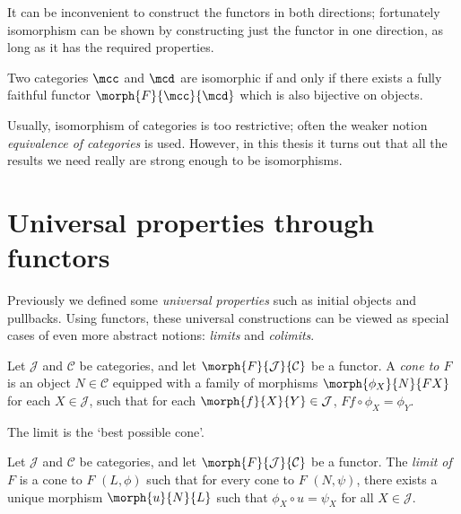It can be inconvenient to construct the functors in both directions; fortunately
isomorphism can be shown by constructing just the functor in one direction, as
long as it has the required properties.

\begin{lemma}
    Two categories \(\mcc\) and \(\mcd\) are isomorphic if and only if there
    exists a fully faithful functor \(\morph{F}{\mcc}{\mcd}\) which is also
    bijective on objects.
\end{lemma}

\begin{remark}
    Usually, isomorphism of categories is too restrictive; often the weaker
    notion \emph{equivalence of categories} is used.
    However, in this thesis it turns out that all the results we need really are
    strong enough to be isomorphisms.
\end{remark}


\section{Universal properties through functors}

Previously we defined some \emph{universal properties} such as initial
objects and pullbacks.
Using functors, these universal constructions can be viewed as special cases of
even more abstract notions: \emph{limits} and \emph{colimits}.

\begin{definition}[Cone]
    Let \(\mathcal{J}\) and \(\mathcal{C}\) be categories, and let
    \(\morph{F}{\mathcal{J}}{\mathcal{C}}\) be a functor.
    A \emph{cone to \(F\)} is an object \(N \in \mathcal{C}\) equipped with
    a family of morphisms \(\morph{\phi_X}{N}{FX}\) for each
    \(X \in \mathcal{J}\), such that for each
    \(\morph{f}{X}{Y} \in \mathcal{J}\),
    \(Ff \circ \phi_X = \phi_Y\).
    \begin{center}
        
    \end{center}
\end{definition}

The limit is the `best possible cone'.

\begin{definition}[Limit]
    Let \(\mathcal{J}\) and \(\mathcal{C}\) be categories, and let
    \(\morph{F}{\mathcal{J}}{\mathcal{C}}\) be a functor.
    The \emph{limit of \(F\)} is a cone to \(F\) \((L,\phi) \) such that for
    every cone to \(F\) \((N, \psi)\), there exists a unique morphism
    \(\morph{u}{N}{L}\) such that \(\phi_X \circ u = \psi_X\) for all
    \(X \in \mathcal{J}\).
    \begin{center}
        
    \end{center}
\end{definition}

